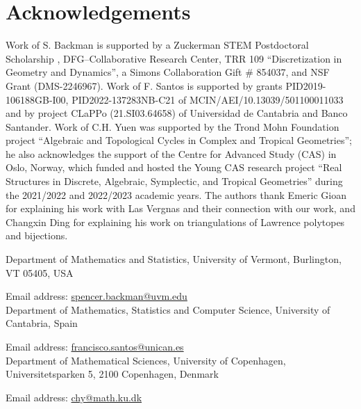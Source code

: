 \documentclass[12pt]{amsart}
\numberwithin{equation}{section}
\theoremstyle{definition}
\newcommand{\paco}[1]{\todo[color=orange!30]{\footnotesize \rm #1 \\ \hfill --- P.}}
\newcommand{\chiho}[1]{\todo[color=green!30]{\rm #1 \\ \hfill --- Ch.}}
\begin{document}
\fi

\section*{Acknowledgements}


Work of S. Backman is supported by a Zuckerman STEM Postdoctoral Scholarship , DFG--Collaborative Research Center, TRR 109 ``Discretization in Geometry and Dynamics'', a Simons Collaboration Gift \# 854037, and NSF Grant (DMS-2246967). Work of F. Santos is supported by grants  PID2019-106188GB-I00,   PID2022-137283NB-C21  of MCIN/AEI/10.13039/501100011033 and by pro\-ject CLaPPo (21.SI03.64658) of Universidad de Cantabria and Banco Santander.
%
Work of C.H. Yuen was supported by the Trond Mohn Foundation project ``Algebraic and Topological Cycles in Complex and Tropical Geometries''; he also acknowledges the support of the Centre for Advanced Study (CAS) in Oslo, Norway, which funded and hosted the Young CAS research project ``Real Structures in Discrete, Algebraic, Symplectic, and Tropical Geometries'' during the 2021/2022 and 2022/2023 academic years. %
The authors thank Emeric Gioan for explaining his work with Las Vergnas and their connection with our work, and Changxin Ding for explaining his work on triangulations of Lawrence polytopes and bijections.





\medskip

Department of Mathematics and Statistics, University of Vermont, Burlington, VT 05405, USA

Email address: \url{spencer.backman@uvm.edu}\\

Department of Mathematics, Statistics and Computer Science, University of Cantabria, Spain

Email address: \url{francisco.santos@unican.es}\\

Department of Mathematical Sciences, University of Copenhagen, Universitetsparken 5, 2100 Copenhagen, Denmark

Email address: \url{chy@math.ku.dk}
\end{document}
